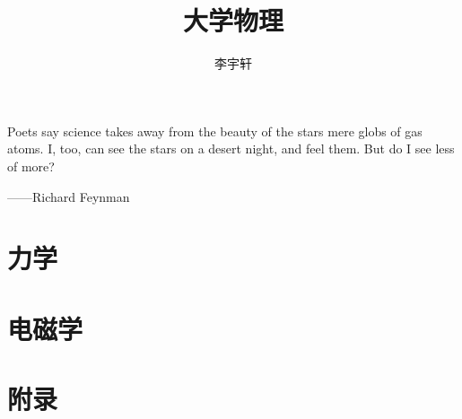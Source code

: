 \title{大学物理}
\author{李宇轩}

\begin{docframe}

\newpage

\begin{LARGE}
    Poets say science takes away from the beauty of the stars mere globs of gas atoms. I, too, can see the stars on a desert night, and feel them. But do I see less of more?

    \begin{flushright}
        ——Richard Feynman
    \end{flushright}    
\end{LARGE}

\part{力学}








\part{电磁学}




\part{附录}


\end{docframe}
